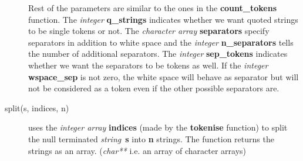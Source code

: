 \documentclass[12pt,a4paper]{report}
\begin{document}
\begin{description}
Rest of the parameters are similar to the ones in the 
\textbf{count\_tokens} function. The {\it integer} \textbf{q\_strings}
indicates whether we want quoted strings to be single tokens or
not. The {\it character array} \textbf{separators} specify separators
in addition to white space and the {\it integer}
\textbf{n\_separators} tells the number of additional separators. The
{\it integer} \textbf{sep\_tokens} indicates whether we want the
separators to be tokens as well. If the {\it integer}
\textbf{wspace\_sep} is not zero, the white space will behave as
separator but will not be considered as a token even if the other
possible separators are.

\item[split(s, indices, n)] uses the {\it integer array}
\textbf{indices} (made by the \textbf{tokenise} function) to split the
null terminated {\it string}~\textbf{s} into \textbf{n} strings. 
The function returns the strings as an array. ({\it char**} i.e. an
array of character arrays)
\end{description}
\end{document}
